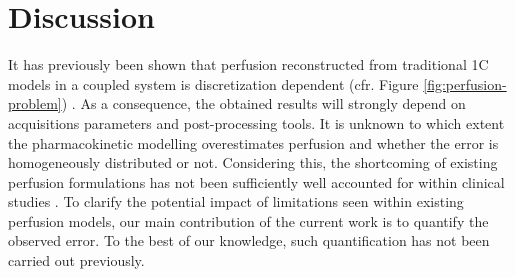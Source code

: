 \documentclass[10pt]{article}
\begin{document}

	


\section{Discussion}
\label{sec:conclusion}

It has previously been shown that perfusion reconstructed from traditional 1C models in a coupled system is discretization dependent (cfr. Figure \ref{fig:perfusion-problem}) \cite{Henkelman1990,Guibert2013,sourbron14}. As a consequence, the obtained results will strongly depend on acquisitions parameters and post-processing tools. It is unknown to which extent the pharmacokinetic modelling overestimates perfusion and whether the error is homogeneously distributed or not. Considering this, the shortcoming of existing perfusion formulations has not been sufficiently well accounted for within clinical studies \cite{Mokin16,Kickingereder15}. To clarify the potential impact of limitations seen within existing perfusion models, our main contribution of the current work is to quantify the observed error. To the best of our knowledge, such quantification has not been carried out previously.
\end{document}
